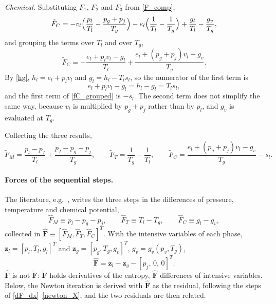 \emph{Chemical.} Substituting $F_1$, $F_2$ and $F_3$ from \eqref{F_comp},
\begin{equation}
\tilde{F}_C=-v_l\Bigl(\frac{p_l}{T_l}-\frac{p_g+p_{j}}{T_g}\Bigr)-e_l\Bigl(\frac1{T_l}-\frac1{T_g}\Bigr)+\frac{g_l}{T_l}-\frac{g_v}{T_g},
\end{equation}
and grouping the terms over $T_l$ and over $T_g$,
\begin{equation}\label{fC_grouped}
\tilde{F}_C=-\frac{e_l+p_lv_l-g_l}{T_l}+\frac{e_l+(p_g+p_{j})v_l-g_v}{T_g}.
\end{equation}
By \eqref{hg}, $h_l=e_l+p_lv_l$ and $g_l=h_l-T_ls_l$, so the numerator of the first term is
\begin{equation}
e_l+p_lv_l-g_l=h_l-g_l=T_ls_l,
\end{equation}
and the first term of \eqref{fC_grouped} is $-s_l$. The second term does not simplify the same way, because $v_l$ is multiplied by $p_g+p_{j}$ rather than by $p_l$, and $g_v$ is evaluated at $T_g$.

Collecting the three results,
\begin{equation}\label{f_conj}
\tilde{F}_M=\frac{p_l-p_I}{T_l}+\frac{p_I-p_g-p_{j}}{T_g},\qquad
\tilde{F}_T=\frac1{T_g}-\frac1{T_l},\qquad
\tilde{F}_C=\frac{e_l+(p_g+p_{j})v_l-g_v}{T_g}-s_l.
\end{equation}

\paragraph{Forces of the sequential steps.}
The literature, e.g.~\cite{Pelanti2022}, writes the three steps in the differences of pressure, temperature and chemical potential,
\begin{equation}\label{F_seq}
\hat{F}_M\equiv p_l-p_g-p_{j},\qquad \hat{F}_T\equiv T_l-T_g,\qquad \hat{F}_C\equiv g_l-g_v,
\end{equation}
collected in $\hat{\boldsymbol{F}}\equiv[\hat{F}_M,\hat{F}_T,\hat{F}_C]^T$. With the intensive variables of each phase, $\boldsymbol{z}_l=[p_l,T_l,g_l]^T$ and $\boldsymbol{z}_g=[p_g,T_g,g_v]^T$, $g_v=g_v(p_v,T_g)$,
\begin{equation}\label{Fhat_def}
\hat{\boldsymbol{F}}=\boldsymbol{z}_l-\boldsymbol{z}_g-[p_{j},\,0,\,0]^T .
\end{equation}
$\hat{\boldsymbol{F}}$ is not $\tilde{\boldsymbol{F}}$: $\tilde{\boldsymbol{F}}$ holds derivatives of the entropy, $\hat{\boldsymbol{F}}$ differences of intensive variables. Below, the Newton iteration is derived with $\hat{\boldsymbol{F}}$ as the residual, following the steps of \eqref{dF_dx}--\eqref{newton_X}, and the two residuals are then related.


